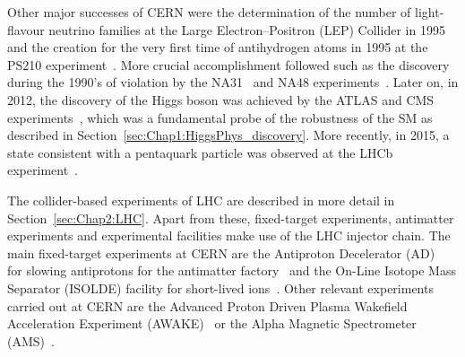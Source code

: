 Other major successes of CERN were the determination of the number of light-flavour neutrino families 
at the Large Electron--Positron %
(LEP) Collider in 1995~\cite{DECAMP1989519} and the creation for the very first time of antihydrogen atoms in 1995 at the PS210 
experiment~\cite{BAUR1996251}. 
More crucial accomplishment followed such as the discovery during the 1990's of \CP violation by the NA31~\cite{BARR1993233_NA31} 
and NA48 experiments~\cite{1999335NA48}. 
Later on, in 2012, the discovery of the Higgs boson was achieved by the 
ATLAS and CMS experiments~\cite{20121_ATLAS_HiggsDiscovery, 201230_CMS_HiggsDiscovery}, which was
a fundamental probe of the robustness of the SM as described in Section~\ref{sec:Chap1:HiggsPhys_discovery}. 
More recently, in 2015, a state consistent with a pentaquark particle was observed at the LHCb experiment~\cite{LHCb:2015yax}. 


The collider-based experiments of LHC are described in more detail in Section~\ref{sec:Chap2:LHC}.
Apart from these, fixed-target experiments, antimatter experiments and experimental 
facilities make use of the LHC injector chain. The main fixed-target experiments at CERN are the Antiproton Decelerator
(AD)~\cite{Maury:1997lnx} for slowing antiprotons for the antimatter factory~\cite{Bulletin:1352088} and the On-Line Isotope Mass Separator 
(ISOLDE) facility for short-lived ions~\cite{Catherall_2017}. Other relevant experiments carried out at CERN are 
 the Advanced Proton Driven Plasma Wakefield Acceleration Experiment (AWAKE)~\cite{Awake_201676} or
 the Alpha Magnetic Spectrometer (AMS)~\cite{AGUILAR2002331}. %
 

